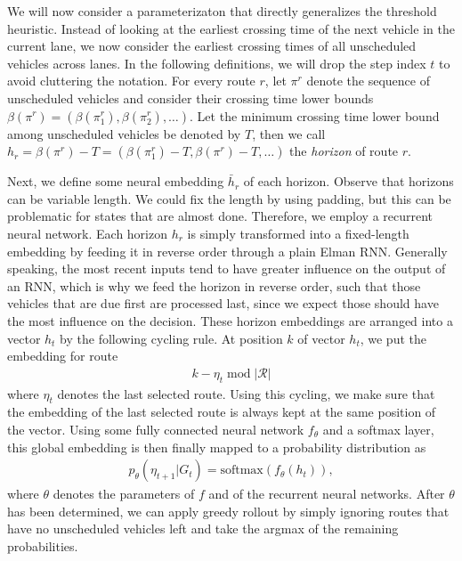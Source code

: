 \documentclass[a4paper]{report}
\theoremstyle{definition}
\theoremstyle{plain}
\begin{document}
We will now consider a parameterizaton that directly generalizes the
threshold heuristic. Instead of looking at the earliest crossing time of the
next vehicle in the current lane, we now consider the earliest crossing
times of all unscheduled vehicles across lanes.
%
In the following definitions, we will drop the step index $t$ to avoid
cluttering the notation.
%
For every route $r$, let $\pi^{r}$ denote the sequence of unscheduled vehicles
and consider their crossing time lower bounds
$\beta(\pi^{r}) = (\beta(\pi^{r}_{1}), \beta(\pi^{r}_{2}), \dots)$. Let the
minimum crossing time lower bound among unscheduled vehicles be denoted by $T$,
then we call
$h_{r} = \beta(\pi^{r}) - T = (\beta(\pi^{r}_{1}) - T, \beta(\pi^{r}) - T, \dots)$
the \textit{horizon} of route $r$.

Next, we define some neural embedding $\bar{h}_{r}$ of each horizon. Observe
that horizons can be variable length. We could fix the length by using padding,
but this can be problematic for states that are almost done. Therefore, we
employ a recurrent neural network. Each horizon $h_r$ is simply transformed into
a fixed-length embedding by feeding it in reverse order through a plain Elman
RNN. Generally speaking, the most recent inputs tend to have greater influence
on the output of an RNN, which is why we feed the horizon in reverse order, such
that those vehicles that are due first are processed last, since we expect those
should have the most influence on the decision. These horizon embeddings are
arranged into a vector $h_{t}$ by the following cycling rule. At position $k$ of
vector $h_{t}$, we put the embedding for route
\begin{align*}
  k - \eta_{t} \; \mathrm{mod} \; |\mathcal{R}|
\end{align*}
where $\eta_{t}$ denotes the last selected route. Using this cycling, we make sure
that the embedding of the last selected route is always kept at the same
position of the vector.
%
Using some fully connected neural network $f_{\theta}$ and a softmax layer, this
global embedding is then finally mapped to a probability distribution as
\begin{align*}
  p_{\theta}(\eta_{t+1} | G_{t}) = \text{softmax} ( f_{\theta}(h_{t})) ,
\end{align*}
where $\theta$ denotes the parameters of $f$ and of the recurrent neural
networks.
After $\theta$ has been determined, we can apply greedy rollout by simply
ignoring routes that have no unscheduled vehicles left and take the argmax of
the remaining probabilities.
\end{document}

